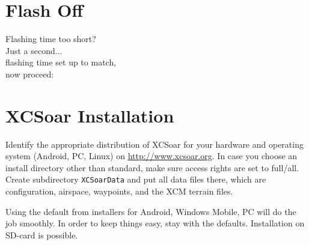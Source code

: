 \documentclass[english,a4paper,12pt]{refrep}
\begin{document}
\section*{{\color[rgb]{.9,.85,0}Flash} Off}

\vspace{2em}
\hspace*{1cm} Flashing time too short?\\
\hspace*{4cm} Just a second...\\
\hspace*{6cm} flashing time set up to match,\\
\hspace*{10cm} now proceed:


\setlength{\parskip}{0.3\baselineskip}
\newpage
\section{XCSoar Installation}\label{ch:XCSinstall}


Identify the appropriate distribution of XCSoar for your hardware and 
operating system \textsf{(Android, PC, Linux)} 
on \url{http://www.xcsoar.org}.
In case you choose an install directory other than standard, make sure access 
rights are set to full/all. Create subdirectory \texttt{XCSoarData} and put all 
data files there, which are configuration, airspace, waypoints, and the XCM 
terrain files.

Using the default from installers for Android, Windows Mobile, PC will do the 
job smoothly.  In order to keep things easy, stay with the defaults. 
Installation on SD-card is possible.
\end{document}
